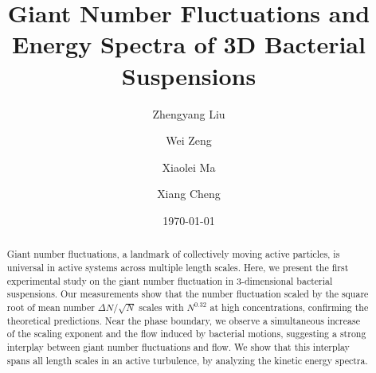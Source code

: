 \documentclass[twocolumn,aps,prl,amsmath,amssymb,longbibliography]{revtex4-2}
\begin{document}
\title{Giant Number Fluctuations and Energy Spectra of 3D Bacterial Suspensions}

\author{Zhengyang Liu}
\author{Wei Zeng}
\author{Xiaolei Ma}
\author{Xiang Cheng}



\date{\today}


\begin{abstract}
Giant number fluctuations, a landmark of collectively moving active particles, is universal in active systems across multiple length scales. Here, we present the first experimental study on the giant number fluctuation in 3-dimensional bacterial suspensions. Our measurements show that the number fluctuation scaled by the square root of mean number $\Delta N / \sqrt N$ scales with $N^{0.32}$ at high concentrations, confirming the theoretical predictions. Near the phase boundary, we observe a simultaneous increase of the scaling exponent and the flow induced by bacterial motions, suggesting a strong interplay between giant number fluctuations and flow. We show that this interplay spans all length scales in an active turbulence, by analyzing the kinetic energy spectra.

\end{abstract}

\maketitle
\end{document}
